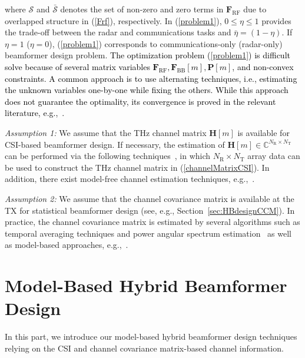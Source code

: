 \documentclass[journal,10pt]{IEEEtran}
\begin{document}
	where  $\mathcal{S}$ and $\bar{\mathcal{S}}$ denotes the set of non-zero and zero terms in $\mathbf{F}_\mathrm{RF}$ due to overlapped structure in (\ref{Frf}), respectively. In (\ref{problem1}), $0\leq \eta \leq 1$ provides the trade-off between the radar and communications tasks and $\bar{\eta} = (1 - \eta)$. If $\eta = 1$ ($\eta = 0$), (\ref{problem1}) corresponds to communications-only (radar-only) beamformer design problem. \textcolor{black}{The optimization problem (\ref{problem1}) is difficult solve because of several matrix variables $\mathbf{F}_\mathrm{RF}, \mathbf{F}_\mathrm{BB}[m],\mathbf{P}[m]$, and non-convex constraints. A common approach is to use alternating techniques, i.e., estimating the unknown variables one-by-one while fixing the others. While this approach does not guarantee the optimality, its convergence is proved in the relevant literature, e.g.,~\cite{hybridBFAltMin,elbirQuantizedCNN2019,elbir2020withoutCSI,radarCommLiuICASSP2019}.  }
	
	
	{\color{black}
		\textit{Assumption 1:} We assume that the THz channel matrix $\mathbf{H}[m]$ is available for CSI-based beamformer design. If necessary, the estimation of $\mathbf{H}[m]\in \mathbb{C}^{N_\mathrm{R}\times N_\mathrm{T}}$ can be performed via the following techniques~\cite{channelEstThz,channelEstThz2,ummimoTareq}, in which $N_\mathrm{R}\times N_\mathrm{T}$ array data can be used to construct the THz channel matrix in (\ref{channelMatrixCSI}). In addition, there exist model-free channel estimation techniques, e.g.,~\cite{elbir2019online,elbir2020_FL_CE}.
		
		\textit{Assumption 2:} We assume that the channel covariance matrix is available at the TX for statistical beamformer design (see, e.g., Section~\ref{sec:HBdesignCCM}).  In practice, the channel covariance matrix is estimated by several algorithms such as temporal averaging techniques and power angular spectrum estimation~\cite{covarianceCCMChannelEst} as well as model-based approaches, e.g.,~\cite{ccmEst_DL}.
	}
	
	
	
	
	\section{Model-Based Hybrid Beamformer Design}
	\label{sec:modelBased}
	In this part, we introduce our model-based hybrid beamformer design techniques relying on the CSI and channel covariance matrix-based channel information.
	
\end{document}
